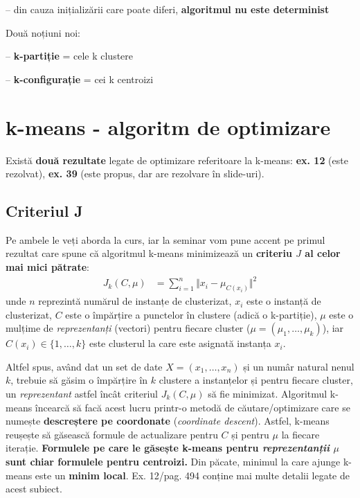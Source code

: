 \documentclass[12pt]{article}
\begin{document}
	
	-- din cauza inițializării care poate diferi, \textbf{algoritmul nu este determinist}
	
	Două noțiuni noi:
	
	-- \textbf{k-partiție} = cele k clustere
	
	--\textbf{ k-configurație} = cei k centroizi
	
	\section{k-means - algoritm de optimizare}
	Există \textbf{două rezultate} legate de optimizare referitoare la k-means:
	\textbf{ex. 12} (este rezolvat),	\textbf{ex. 39} (este propus, dar are rezolvare în slide-uri).
	
	\subsection{Criteriul J}
	
	Pe ambele le veți aborda la curs, iar la seminar vom pune accent pe primul rezultat care spune că algoritmul k-means minimizează un \textbf{criteriu $J$ al celor mai mici pătrate}:
	\begin{align*}
	J_k(C,\mu) &= \sum_{i=1}^{n} \Vert x_i - \mu_{C(x_i)} \Vert^2
	\end{align*}
	unde $n$ reprezintă numărul de instanțe de clusterizat, $x_i$ este o instanță de clusterizat, $C$ este o împărțire a punctelor în clustere (adică o k-partiție), $\mu$ este o mulțime de \textit{reprezentanți} (vectori) pentru fiecare cluster ($\mu = (\mu_1,\dots,\mu_k)$), iar $C(x_i) \in \{1,\dots,k\}$ este clusterul la care este asignată instanța $x_i$.
	
	Altfel spus, având dat un set de date $X = (x_1,\dots,x_n)$ și un numâr natural nenul $k$, trebuie să găsim o împărțire în $k$ clustere a instanțelor și pentru fiecare cluster, un \textit{reprezentant} astfel încât criteriul $J_k(C,\mu)$ să fie minimizat. Algoritmul k-means încearcă să facă acest lucru printr-o metodă de căutare/optimizare care se numește \textbf{descreștere pe coordonate} (\textit{coordinate descent}). Astfel, k-means reușește să găsească formule de actualizare pentru $C$ și pentru $\mu$ la fiecare iterație. \textbf{Formulele pe care le găsește k-means pentru \textit{reprezentanții} $\mu$ sunt chiar formulele pentru centroizi.} Din păcate, minimul la care ajunge k-means este un \textbf{minim local}. Ex. 12/pag. 494 conține mai multe detalii legate de acest subiect.
	
\end{document}
